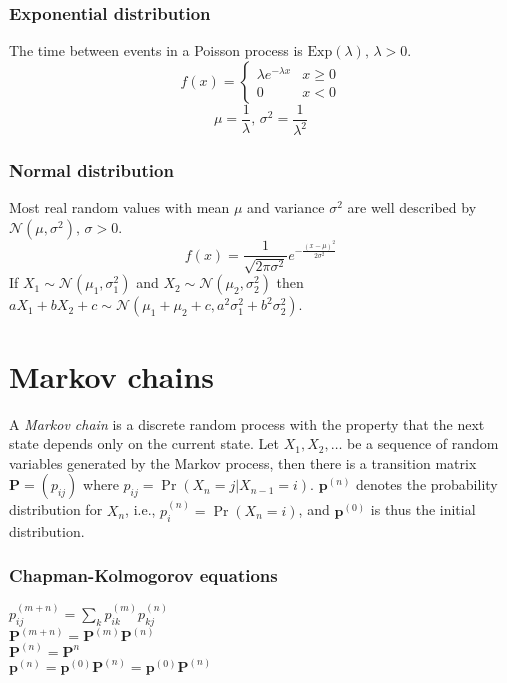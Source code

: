 \subsubsection{Exponential distribution}
The time between events in a Poisson process is $\textrm{Exp}(\lambda),\,\lambda>0$.
$$f(x) = \left\{
\begin{array}{cl}
\lambda e^{-\lambda x} & x\geq0\\
0 & x<0
\end{array}\right.$$
$$\mu=\frac{1}{\lambda},\,\sigma^2=\frac{1}{\lambda^2}$$

\subsubsection{Normal distribution}
Most real random values with mean $\mu$ and variance $\sigma^2$ are well described by $\mathcal{N}(\mu,\sigma^2),\,\sigma>0$.
$$f(x) = \frac{1}{\sqrt{2\pi\sigma^2}}e^{-\frac{(x-\mu)^2}{2\sigma^2}}$$
If $X_1 \sim \mathcal{N}(\mu_1,\sigma_1^2)$ and $X_2 \sim \mathcal{N}(\mu_2,\sigma_2^2)$ then  $aX_1 + bX_2 + c \sim \mathcal{N}(\mu_1+\mu_2+c,a^2\sigma_1^2+b^2\sigma_2^2)$.

\section{Markov chains}
A \emph{Markov chain} is a discrete random process with the property that the next state depends only on the current state. Let $X_1,X_2,\ldots$ be a sequence of random variables generated by the Markov process, then there is a transition matrix $\mathbf{P} = (p_{ij})$ where $p_{ij} = \Pr(X_n = j | X_{n-1} = i)$. $\mathbf{p}^{(n)}$ denotes the probability distribution for $X_n$, i.e., $p^{(n)}_i = \Pr(X_n = i)$, and $\mathbf{p}^{(0)}$ is thus the initial distribution.

\vspace{5mm} %
\subsubsection{Chapman-Kolmogorov equations}
$p_{ij}^{(m+n)}=\sum_k p_{ik}^{(m)}p_{kj}^{(n)}$\\
$\mathbf{P}^{(m+n)} = \mathbf{P}^{(m)}\mathbf{P}^{(n)}$\\
$\mathbf{P}^{(n)} = \mathbf{P}^n$\\
$\mathbf{p}^{(n)} = \mathbf{p}^{(0)}\mathbf{P}^{(n)} = \mathbf{p}^{(0)}\mathbf{P}^{(n)}$

\vspace{5mm} %
